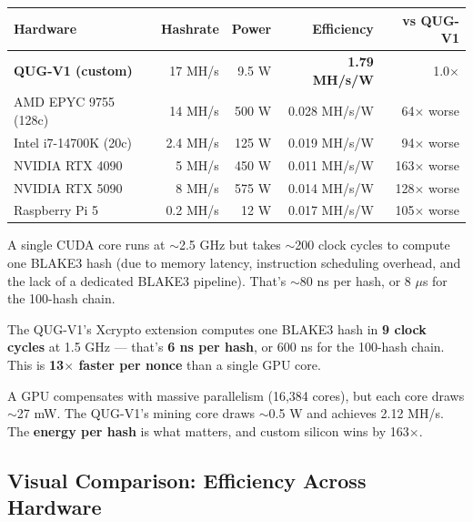 \documentclass[11pt,a4paper]{article}
\begin{document}
\begin{center}
\begin{tabular}{@{}p{4cm}rrrr@{}}
\toprule
\textbf{Hardware} & \textbf{Hashrate} & \textbf{Power} & \textbf{Efficiency} & \textbf{vs QUG-V1} \\
\midrule
\textbf{QUG-V1 (custom)} & 17 MH/s & 9.5 W & \textbf{1.79 MH/s/W} & 1.0$\times$ \\
AMD EPYC 9755 (128c) & 14 MH/s & 500 W & 0.028 MH/s/W & 64$\times$ worse \\
Intel i7-14700K (20c) & 2.4 MH/s & 125 W & 0.019 MH/s/W & 94$\times$ worse \\
NVIDIA RTX 4090 & 5 MH/s & 450 W & 0.011 MH/s/W & 163$\times$ worse \\
NVIDIA RTX 5090 & 8 MH/s & 575 W & 0.014 MH/s/W & 128$\times$ worse \\
Raspberry Pi 5 & 0.2 MH/s & 12 W & 0.017 MH/s/W & 105$\times$ worse \\
\bottomrule
\end{tabular}
\end{center}

\begin{warningbox}
A single CUDA core runs at $\sim$2.5 GHz but takes $\sim$200 clock cycles to compute one BLAKE3 hash (due to memory latency, instruction scheduling overhead, and the lack of a dedicated BLAKE3 pipeline). That's $\sim$80 ns per hash, or 8 $\mu$s for the 100-hash chain.

The QUG-V1's Xcrypto extension computes one BLAKE3 hash in \textbf{9 clock cycles} at 1.5 GHz --- that's \textbf{6 ns per hash}, or 600 ns for the 100-hash chain. This is \textbf{13$\times$ faster per nonce} than a single GPU core.

A GPU compensates with massive parallelism (16,384 cores), but each core draws $\sim$27 mW. The QUG-V1's mining core draws $\sim$0.5 W and achieves 2.12 MH/s. The \textbf{energy per hash} is what matters, and custom silicon wins by 163$\times$.
\end{warningbox}

\subsection{Visual Comparison: Efficiency Across Hardware}
\end{document}
